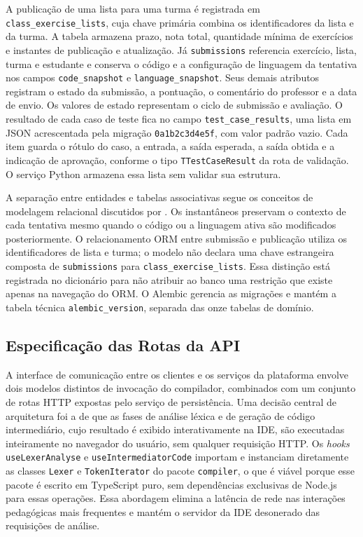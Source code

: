 A publicação de uma lista para uma turma é registrada em \texttt{class\_exercise\_lists}, cuja chave primária combina os identificadores da lista e da turma. A tabela armazena prazo, nota total, quantidade mínima de exercícios e instantes de publicação e atualização. Já \texttt{submissions} referencia exercício, lista, turma e estudante e conserva o código e a configuração de linguagem da tentativa nos campos \texttt{code\_snapshot} e \texttt{language\_snapshot}. Seus demais atributos registram o estado da submissão, a pontuação, o comentário do professor e a data de envio. Os valores de estado representam o ciclo de submissão e avaliação. O resultado de cada caso de teste fica no campo \texttt{test\_case\_results}, uma lista em JSON acrescentada pela migração \texttt{0a1b2c3d4e5f}, com valor padrão vazio. Cada item guarda o rótulo do caso, a entrada, a saída esperada, a saída obtida e a indicação de aprovação, conforme o tipo \texttt{TTestCaseResult} da rota de validação. O serviço Python armazena essa lista sem validar sua estrutura.

A separação entre entidades e tabelas associativas segue os conceitos de modelagem relacional discutidos por . Os instantâneos preservam o contexto de cada tentativa mesmo quando o código ou a linguagem ativa são modificados posteriormente. O relacionamento ORM entre submissão e publicação utiliza os identificadores de lista e turma; o modelo não declara uma chave estrangeira composta de \texttt{submissions} para \texttt{class\_exercise\_lists}. Essa distinção está registrada no dicionário para não atribuir ao banco uma restrição que existe apenas na navegação do ORM. O Alembic gerencia as migrações e mantém a tabela técnica \texttt{alembic\_version}, separada das onze tabelas de domínio.

\subsection{Especificação das Rotas da API}
\label{subsec:rotas-api}

A interface de comunicação entre os clientes e os serviços da plataforma envolve dois modelos distintos de invocação do compilador, combinados com um conjunto de rotas HTTP expostas pelo serviço de persistência. Uma decisão central de arquitetura foi a de que as fases de análise léxica e de geração de código intermediário, cujo resultado é exibido interativamente na IDE, são executadas inteiramente no navegador do usuário, sem qualquer requisição HTTP. Os \textit{hooks} \texttt{useLexerAnalyse} e \texttt{useIntermediatorCode} importam e instanciam diretamente as classes \texttt{Lexer} e \texttt{TokenIterator} do pacote \texttt{compiler}, o que é viável porque esse pacote é escrito em TypeScript puro, sem dependências exclusivas de Node.js para essas operações. Essa abordagem elimina a latência de rede nas interações pedagógicas mais frequentes e mantém o servidor da IDE desonerado das requisições de análise.

